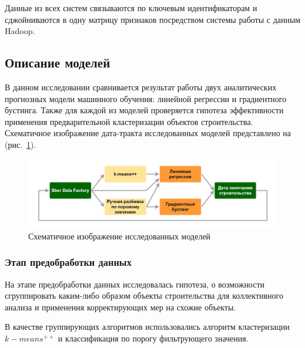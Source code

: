 \documentclass[12pt,a4paper]{article} %
\begin{document}
Данные из всех систем связываются по ключевым идентификаторам и сджойниваются в одну матрицу признаков посредством системы работы с данным Hadoop.

\subsection{Описание моделей}

В данном исследовании сравнивается результат работы двух аналитических прогнозных модели машинного обучения: линейной регрессии и градиентного бустинга.
Также для каждой из моделей проверяется гипотеза эффективности применения предварительной кластеризации объектов строительства. Схематичное изображение дата-тракта исследованных моделей представлено на (рис.~\ref{fig:data_tract}).

 
\begin{figure}[h]
	
	\centering
	
	\includegraphics[width=\linewidth]{data_tract.jpg}
	
	\caption{Схематичное изображение исследованных моделей}
	
	\label{fig:data_tract}
	
\end{figure} 
 
 
 
\subsubsection{Этап предобработки данных}
 
На этапе предобработки данных исследовалась гипотеза, о возможности сгруппировать каким-либо образом объекты строительства для коллективного анализа и применения корректирующих мер на схожие объекты. 

В качестве группирующих алгоритмов использовались алгоритм кластеризации $k-means^{++}$ и классификация по порогу фильтрующего значения.
\end{document}
